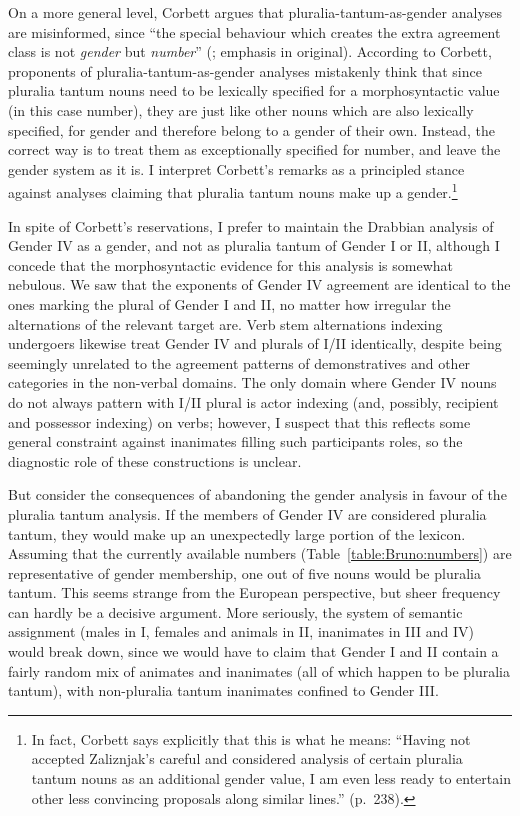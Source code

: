 \documentclass[output=collectionpaper]{langsci/langscibook}
\begin{document}
On a more general level, Corbett argues that pluralia-tantum-as-gender analyses are misinformed, since ``the special behaviour which creates the extra agreement class is not \emph{gender} but \emph{number}'' (\citealt[238]{Corbett2012}; emphasis in original). According to Corbett, proponents of pluralia-tantum-as-gender analyses mistakenly think that since pluralia tantum nouns need to be lexically specified for a morphosyntactic value (in this case number), they are just like other nouns \textendash{} which are also lexically specified, for gender \textendash{} and therefore belong to a gender of their own. Instead, the correct way is to treat them as exceptionally specified for number, and leave the gender system as it is. I interpret Corbett's remarks as a principled stance against analyses claiming that pluralia tantum nouns make up a gender.\footnote{In fact, Corbett says explicitly that this is what he means: ``Having not accepted Zaliznjak's careful and considered analysis of certain  pluralia tantum nouns as an additional gender value, I am even less ready to entertain other less convincing proposals along similar lines.'' (p.~238).}


In spite of Corbett's reservations, I prefer to maintain the Drabbian analysis of Gender IV as a gender, and not as pluralia tantum of Gender I or II, although I concede that the morphosyntactic evidence for this analysis is somewhat nebulous. We saw that the exponents of Gender IV agreement are identical to the ones marking the plural of Gender I and II, no matter how irregular the alternations of the relevant target are. Verb stem alternations indexing undergoers likewise treat Gender IV and plurals of I/II identically, despite being seemingly unrelated to the agreement patterns of demonstratives and other categories in the non-verbal domains. The only domain where Gender IV nouns do not always pattern with I/II plural is actor indexing (and, possibly, recipient and possessor indexing) on verbs; however, I suspect that this reflects some general constraint against inanimates filling such participants roles, so the diagnostic role of these constructions is unclear.

But consider the consequences of abandoning the gender analysis in favour of the pluralia tantum analysis. If the members of Gender IV are considered pluralia tantum, they would make up an unexpectedly large portion of the lexicon. Assuming that the currently available numbers (Table~\ref{table:Bruno:numbers}) are representative of gender membership, one out of five nouns would be pluralia tantum. This seems strange from the European perspective, but sheer frequency can hardly be a decisive argument. More seriously, the system of semantic assignment (males in I, females and animals in II, inanimates in III and IV) would break down, since we would have to claim that Gender I and II contain a fairly random mix of animates and inanimates (all of which happen to be pluralia tantum), with non-pluralia tantum inanimates confined to Gender III.
\end{document}
